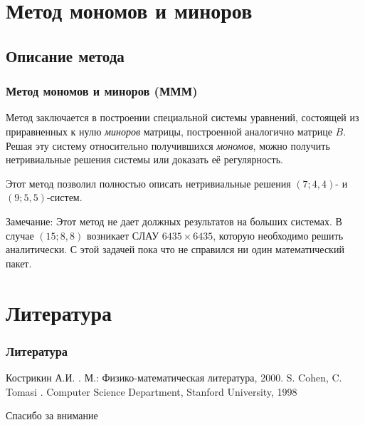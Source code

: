 \documentclass[russian,hyperref={unicode}]{beamer}
\begin{document}
\section{Метод мономов и миноров}
\subsection{Описание метода}
\frame
{
	\frametitle{Метод мономов и миноров (МММ)}
	Метод заключается в построении специальной системы уравнений, состоящей из 
	приравненных к нулю \textit{миноров} матрицы, построенной аналогично матрице $B$. 
	Решая эту систему относительно получившихся \textit{мономов}, можно получить 
	нетривиальные решения системы или доказать её регулярность.	
	
	Этот метод позволил полностью описать нетривиальные решения $(7; 4, 4)$- и $(9; 
	5,5)$-систем.

	\begin{alertblock}{Замечание:}
		Этот метод не дает должных результатов на больших системах. В случае 
		$(15; 8, 8)$ возникает СЛАУ $6435 \times 6435$, которую необходимо решить 
		аналитически. С этой задачей пока что не справился ни один математический 
		пакет.
	\end{alertblock}
}
\section{Литература}
\frame
{
	\frametitle{Литература}
	\begin{thebibliography}{10}
	\beamertemplatebookbibitems
    	Кострикин А.И. 
    	.
    	\newblock М.: Физико-математическая литература, 2000.
	\beamertemplatearticlebibitems
    	S. Cohen, C. Tomasi
    	.
    	\newblock Computer Science Department, Stanford University, 1998
    \end{thebibliography}
}
\frame
{
	\begin{center}
		\huge Спасибо за внимание
	\end{center}
}
\end{document}
